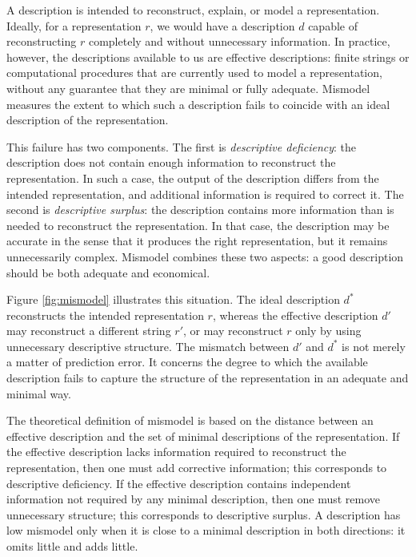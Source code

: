 A description is intended to reconstruct, explain, or model a representation. Ideally, for a representation $r$, we would have a description $d$ capable of reconstructing $r$ completely and without unnecessary information. In practice, however, the descriptions available to us are effective descriptions: finite strings or computational procedures that are currently used to model a representation, without any guarantee that they are minimal or fully adequate. Mismodel measures the extent to which such a description fails to coincide with an ideal description of the representation.

This failure has two components. The first is \emph{descriptive deficiency}: the description does not contain enough information to reconstruct the representation. In such a case, the output of the description differs from the intended representation, and additional information is required to correct it. The second is \emph{descriptive surplus}: the description contains more information than is needed to reconstruct the representation. In that case, the description may be accurate in the sense that it produces the right representation, but it remains unnecessarily complex. Mismodel combines these two aspects: a good description should be both adequate and economical.

Figure \ref{fig:mismodel} illustrates this situation. The ideal description $d^\ast$ reconstructs the intended representation $r$, whereas the effective description $d'$ may reconstruct a different string $r'$, or may reconstruct $r$ only by using unnecessary descriptive structure. The mismatch between $d'$ and $d^\ast$ is not merely a matter of prediction error. It concerns the degree to which the available description fails to capture the structure of the representation in an adequate and minimal way.

The theoretical definition of mismodel is based on the distance between an effective description and the set of minimal descriptions of the representation. If the effective description lacks information required to reconstruct the representation, then one must add corrective information; this corresponds to descriptive deficiency. If the effective description contains independent information not required by any minimal description, then one must remove unnecessary structure; this corresponds to descriptive surplus. A description has low mismodel only when it is close to a minimal description in both directions: it omits little and adds little.

